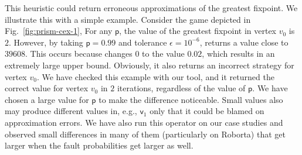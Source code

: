 This heuristic could return erroneous approximations of the greatest fixpoint.  We illustrate this with a simple example. Consider  the game depicted in Fig.~\ref{fig:prism-cex-1}, For any $\textsf{p}$, the value of the greatest fixpoint in vertex $v_0$ is $2$. However, by taking $\textsf{p}=0.99$ and tolerance $\epsilon=10^{-6}$, {\Prism} returns a value close to $39608$. %
This occurs because  {\Prism} changes $0$ to the value $0.02$, which results in an extremely large upper bound.
Obviously, it also returns an incorrect strategy for vertex $v_0$.  We have checked this example with our tool, and it returned the correct value for vertex $v_0$ in $2$ iterations, regardless of the value of $\textsf{p}$.
%
We have chosen a large value for $\textsf{p}$ to make the difference noticeable. Small values also may produce different values in, e.g., $\textsf{v}_1$ only that it could be blamed on approximation errors.
%
%
We have also run this operator on our case studies and observed small differences in many of them (particularly on Roborta) that get larger when the fault probabilities get larger as well.%



